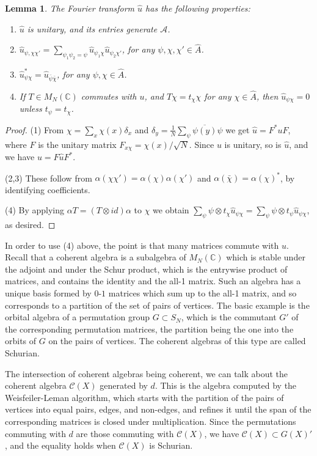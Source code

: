 \documentclass[11pt]{amsart}
\newtheorem{lemma}[theorem]{Lemma}
\newcommand{\A}{\mathcal A}
\newcommand{\C}{\mathcal C}
\newcommand{\CC}{\mathbb C}
\newcommand{\hA}{\widehat A}
\newcommand{\hu}{\widehat u}
\newcommand{\bchi}{\bar\chi}
\newcommand{\bpsi}{\bar\psi}
\begin{document}
\begin{lemma}
The Fourier transform $\hu$ has the following properties:
\begin{enumerate}
\item $\hu$ is unitary, and its entries generate $\A$.
\item $\hu_{\psi,\chi\chi'}=\sum_{\psi_1\psi_2=\psi}\hu_{\psi_1\chi}\hu_{\psi_2\chi'}$, for any $\psi,\chi,\chi'\in\hA$.
\item $\hu_{\psi\chi}^*=\hu_{\bpsi\bchi}$, for any $\psi,\chi\in\hA$.
\item If $T\in M_N(\CC)$ commutes with $u$, and $T\chi=t_\chi\chi$ for any $\chi\in\hA$, then $\hu_{\psi\chi}=0$ unless $t_\psi=t_\chi$.
\end{enumerate}
\end{lemma}

\begin{proof}
(1) From $\chi=\sum_x\chi(x)\delta_x$ and $\delta_y=\frac{1}{N}\sum_\psi\overline{\psi(y)}\psi$ we get $\hu=F^*uF$, where $F$ is the unitary matrix $F_{x\chi}=\chi(x)/\sqrt{N}$. Since $u$ is unitary, so is $\hu$, and we have $u=F\hu F^*$.

(2,3) These follow from $\alpha(\chi\chi')=\alpha(\chi)\alpha(\chi')$ and $\alpha(\bchi)=\alpha(\chi)^*$, by identifying coefficients.

(4) By applying $\alpha T=(T\otimes id)\alpha$ to $\chi$ we obtain $\sum_\psi\psi\otimes t_\chi\hu_{\psi\chi}=\sum_\psi\psi\otimes t_\psi\hu_{\psi\chi}$, as desired.
\end{proof}

In order to use (4) above, the point is that many matrices commute with $u$. Recall that a coherent algebra is a subalgebra of $M_N(\CC)$ which is stable under the adjoint and under the Schur product, which is the entrywise product of matrices, and contains the identity and the all-1 matrix. Such an algebra has a unique basis formed by $0$-$1$ matrices which sum up to the all-1 matrix, and so corresponds to a partition of the set of pairs of vertices. The basic example is the orbital algebra of a permutation group $G\subset S_N$, which is the commutant $G'$ of the corresponding permutation matrices, the partition being the one into the orbits of $G$ on the pairs of vertices. The coherent algebras of this type are called Schurian.

The intersection of coherent algebras being coherent, we can talk about the coherent algebra $\C(X)$ generated by $d$. This is the algebra computed by the Weisfeiler-Leman algorithm, which starts with the partition of the pairs of vertices into equal pairs, edges, and non-edges, and refines it until the span of the corresponding matrices is closed under multiplication. Since the permutations commuting with $d$ are those commuting with $\C(X)$, we have $\C(X)\subset G(X)'$, and the equality holds when $\C(X)$ is Schurian.
\end{document}
